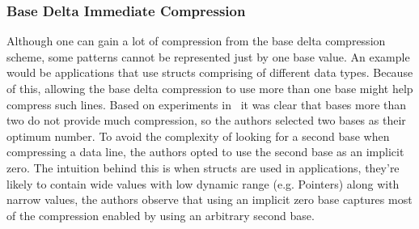 \subsubsection{Base Delta Immediate Compression}
Although one can gain a lot of compression from the base delta compression scheme, some patterns cannot be represented just by one base value. An example would be applications that use structs comprising of different data types. Because of this, allowing the base delta compression to use more than one base might help compress such lines. Based on experiments in~\cite{bdi} it was clear that bases more than two do not provide much compression, so the authors selected two bases as their optimum number. To avoid the complexity of looking for a second base when compressing a data line, the authors opted to use the second base as an implicit zero. The intuition behind this is when structs are used in applications, they're likely to contain wide values with low dynamic range (e.g. Pointers) along with narrow values, the authors observe that using an implicit zero base captures most of the compression enabled by using an arbitrary second base.
